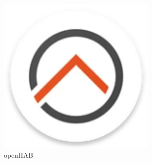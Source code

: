 \begin{figure}[ht!]
\begin{minipage}[t]{0.3\linewidth}
 		\includegraphics[width=0.7\textwidth]{img/openhab_logo.png}
 		\caption[openHAB Logo]{openHAB}
 		\label{fig:openhab-logo}
 	\end{minipage}
\end{figure}